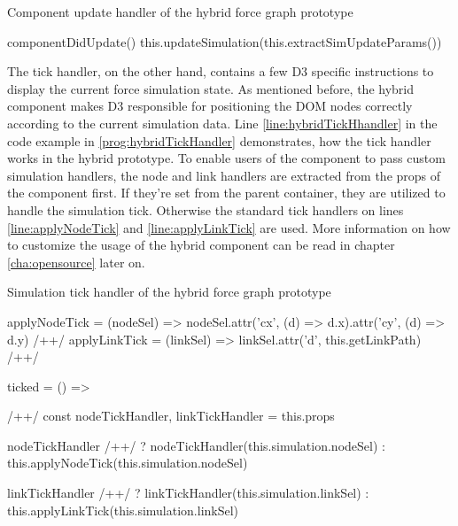\begin{program}
\caption{Component update handler of the hybrid force graph prototype}
\label{prog:hybridUpdateHandler}
\begin{JsCode}
componentDidUpdate() {
  this.updateSimulation(this.extractSimUpdateParams())
}
\end{JsCode}
\end{program}

The tick handler, on the other hand, contains a few D3 specific instructions to display the current force simulation state. As mentioned before, the hybrid component makes D3 responsible for positioning the DOM nodes correctly according to the current simulation data. Line \ref{line:hybridTickHhandler} in the code example in \ref{prog:hybridTickHandler} demonstrates, how the tick handler works in the hybrid prototype. To enable users of the component to pass custom simulation handlers, the node and link handlers are extracted from the props of the component first. If they're set from the parent container, they are utilized to handle the simulation tick. Otherwise the standard tick handlers on lines \ref{line:applyNodeTick} and \ref{line:applyLinkTick} are used. More information on how to customize the usage of the hybrid component can be read in chapter \ref{cha:opensource} later on.

\begin{program}
\caption{Simulation tick handler of the hybrid force graph prototype}
\label{prog:hybridTickHandler}
\begin{JsCode}
applyNodeTick = (nodeSel) => nodeSel.attr('cx', (d) => d.x).attr('cy', (d) => d.y) /+\label{line:applyNodeTick}+/
applyLinkTick = (linkSel) => linkSel.attr('d', this.getLinkPath) /+\label{line:applyLinkTick}+/

ticked = () => { /+\label{line:hybridTickHhandler}+/
  const { nodeTickHandler, linkTickHandler } = this.props

  nodeTickHandler /+\label{line:decideNodeTickHandler}+/
    ? nodeTickHandler(this.simulation.nodeSel)
    : this.applyNodeTick(this.simulation.nodeSel)

  linkTickHandler /+\label{line:decideLinkTickHandler}+/
    ? linkTickHandler(this.simulation.linkSel)
    : this.applyLinkTick(this.simulation.linkSel)
}
\end{JsCode}
\end{program}


